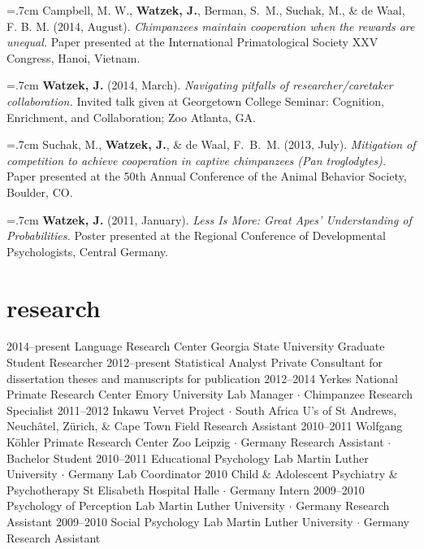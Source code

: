 \documentclass[]{friggeri-cv}
\begin{document}
\hangindent=.7cm Campbell, M. W., \textbf{Watzek, J.}, Berman, S.~M., Suchak, M., \& de Waal, F. B. M. (2014, August). \emph{Chimpanzees maintain cooperation when the rewards are unequal.} Paper presented at the International Primatological Society XXV Congress, Hanoi, Vietnam.

\hangindent=.7cm \textbf{Watzek, J.} (2014, March). \emph{Navigating pitfalls of researcher/caretaker collaboration.} Invited talk given at Georgetown College Seminar: Cognition, Enrichment, and Collaboration; Zoo Atlanta, GA.

\hangindent=.7cm Suchak, M., \textbf{Watzek, J.}, \& de Waal, F.~B.~M. (2013, July). \emph{Mitigation of competition to achieve cooperation in captive chimpanzees \emph{(Pan troglodytes)}.} Paper presented at the 50th Annual Conference of the Animal Behavior Society, Boulder, CO.

\hangindent=.7cm \textbf{Watzek, J.} (2011, January). \emph{Less Is More: Great Apes' Understanding of Probabilities.} Poster presented at the Regional Conference of Developmental Psychologists, Central Germany.\\[-.1cm]


\newpage
\thispagestyle{fancy}

\section{research}

\begin{entrylist}
  \entry
    {2014--present}
    {Language Research Center}
    {Georgia State University}
    {Graduate Student Researcher}
  \entry
    {2012--present}
    {Statistical Analyst}
    {Private}
    {Consultant for dissertation theses and manuscripts for publication}
  \entry
    {2012--2014}
    {Yerkes National Primate Research Center}
    {Emory University}
    {Lab Manager $\cdot$ Chimpanzee Research Specialist}
  \entry
    {2011--2012}
    {Inkawu Vervet Project $\cdot$ South Africa}
    {U's of St Andrews, Neuch\^{a}tel, Z\"urich, \& Cape Town}
    {Field Research Assistant}
  \entry
    {2010--2011}
    {Wolfgang K\"{o}hler Primate Research Center}
    {Zoo Leipzig $\cdot$ Germany}
    {Research Assistant $\cdot$ Bachelor Student}
  \entry
    {2010--2011}
    {Educational Psychology Lab}
    {Martin Luther University $\cdot$ Germany}
    {Lab Coordinator}
  \entry
    {2010}
    {Child \& Adolescent Psychiatry \& Psychotherapy}
    {St Elisabeth Hospital Halle $\cdot$ Germany}
    {Intern}
  \entry
    {2009--2010}
    {Psychology of Perception Lab}
    {Martin Luther University $\cdot$ Germany}
    {Research Assistant}
  \entry
    {2009--2010}
    {Social Psychology Lab}
    {Martin Luther University $\cdot$ Germany}
    {Research Assistant}
\end{entrylist}
\end{document}
